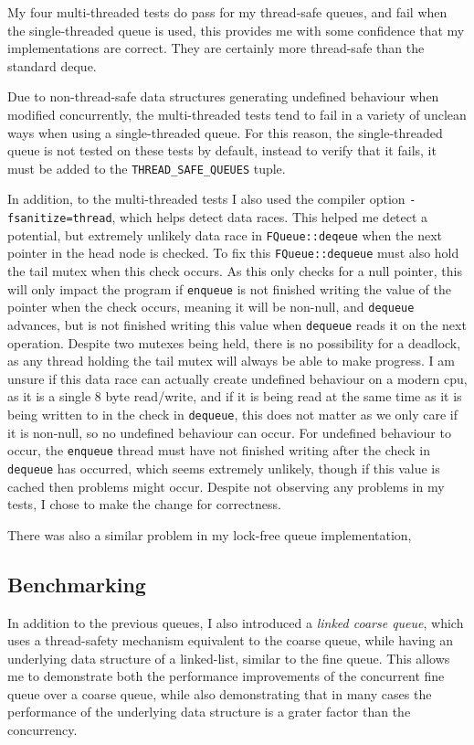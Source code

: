 \documentclass{article}
\begin{document}
My four multi-threaded tests do pass for my thread-safe queues, and fail when
the single-threaded queue is used, this provides me with some confidence that my
implementations are correct. They are certainly more thread-safe than the
standard deque.

Due to non-thread-safe data structures generating undefined behaviour when
modified concurrently, the multi-threaded tests tend to fail in a variety of
unclean ways when using a single-threaded queue. For this reason, the
single-threaded queue is not tested on these tests by default, instead to verify
that it fails, it must be added to the \verb|THREAD_SAFE_QUEUES| tuple.

In addition, to the multi-threaded tests I also used the compiler option
\verb|-fsanitize=thread|, which helps detect data races. This helped me detect a
potential, but extremely unlikely data race in \verb|FQueue::deqeue| when the
next pointer in the head node is checked. To fix this \verb|FQueue::dequeue|
must also hold the tail mutex when this check occurs. As this only checks for a
null pointer, this will only impact the program if \verb|enqueue| is not
finished writing the value of the pointer when the check occurs, meaning it will
be non-null, and \verb|dequeue| advances, but is not finished writing this value
when \verb|dequeue| reads it on the next operation. Despite two mutexes being
held, there is no possibility for a deadlock, as any thread holding the tail
mutex will always be able to make progress. I am unsure if this data race can
actually create undefined behaviour on a modern cpu, as it is a single 8 byte
read/write, and if it is being read at the same time as it is being written
to in the check in \verb|dequeue|, this does not matter as we only care if it
is non-null, so no undefined behaviour can occur. For undefined behaviour to
occur, the \verb|enqueue| thread must have not finished writing after the check
in \verb|dequeue| has occurred, which seems extremely unlikely, though if this
value is cached then problems might occur. Despite not observing any problems in
my tests, I chose to make the change for correctness. 

There was also a similar problem in my lock-free queue implementation, 

\subsection{Benchmarking}
In addition to the previous queues, I also introduced a \textit{linked coarse
queue}, which uses a thread-safety mechanism equivalent to the coarse queue,
while having an underlying data structure of a linked-list, similar to the fine
queue. This allows me to demonstrate both the performance improvements of the
concurrent fine queue over a coarse queue, while also demonstrating that in many
cases the performance of the underlying data structure is a grater factor than
the concurrency.
\end{document}
